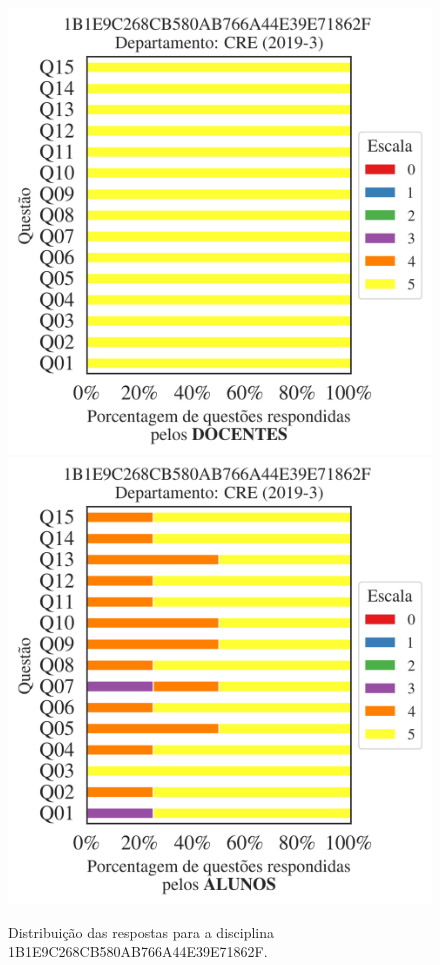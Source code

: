\documentclass[a4paper,10pt]{article}
\begin{document}
\begin{figure}[h]
\centering
\includegraphics[width=0.485\linewidth]{analise_disciplina_departamento_CRE_1B1E9C268CB580AB766A44E39E71862F_docentes.png}
\includegraphics[width=0.485\linewidth]{analise_disciplina_departamento_CRE_1B1E9C268CB580AB766A44E39E71862F_alunos.png}
\caption{\label{fig:analise_geral_departamento}                Distribuição das respostas para a disciplina 1B1E9C268CB580AB766A44E39E71862F. }
\end{figure}
\end{document}
